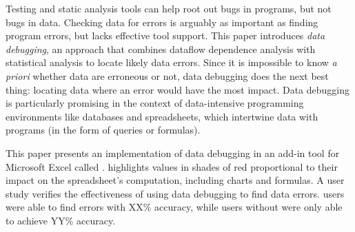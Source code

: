 Testing and static analysis tools can help root out bugs in programs,
but not bugs in data. Checking data for errors is arguably as
important as finding program errors, but lacks effective tool
support. This paper introduces \emph{data debugging}, an approach that
combines dataflow dependence analysis with statistical analysis to
locate likely data errors. Since it is impossible to know \emph{a
priori} whether data are erroneous or not, data debugging does the
next best thing: locating data where an error would have the most
impact. Data debugging is particularly promising in the context of
data-intensive programming environments like databases and
spreadsheets, which intertwine data with programs (in the form of
queries or formulas).

This paper presents an implementation of data
debugging in an add-in tool for Microsoft Excel called \checkcell{}.
\checkcell{} highlights values in shades of red proportional to their impact on the
spreadsheet's computation, including charts and formulas. A user study
verifies the effectiveness of using data debugging to find data
errors. \checkcell{} users were able to find errors with XX\%
accuracy, while users without were only able to achieve YY\% accuracy.
